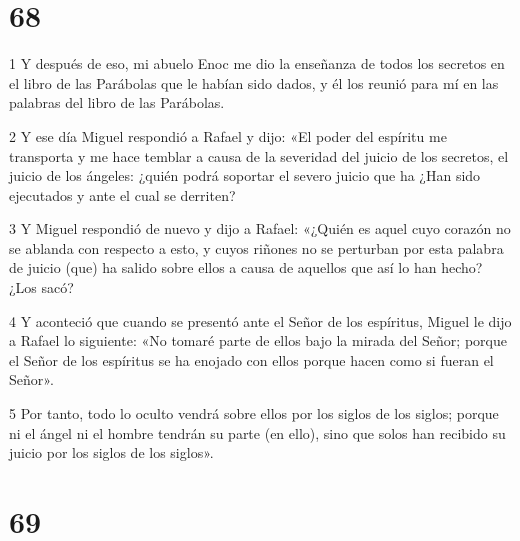 \chapter{68}

\par 1 Y después de eso, mi abuelo Enoc me dio la enseñanza de todos los secretos en el libro de las Parábolas que le habían sido dados, y él los reunió para mí en las palabras del libro de las Parábolas.
\par 2 Y ese día Miguel respondió a Rafael y dijo: «El poder del espíritu me transporta y me hace temblar a causa de la severidad del juicio de los secretos, el juicio de los ángeles: ¿quién podrá soportar el severo juicio que ha ¿Han sido ejecutados y ante el cual se derriten?
\par 3 Y Miguel respondió de nuevo y dijo a Rafael: «¿Quién es aquel cuyo corazón no se ablanda con respecto a esto, y cuyos riñones no se perturban por esta palabra de juicio (que) ha salido sobre ellos a causa de aquellos que así lo han hecho? ¿Los sacó?
\par 4 Y aconteció que cuando se presentó ante el Señor de los espíritus, Miguel le dijo a Rafael lo siguiente: «No tomaré parte de ellos bajo la mirada del Señor; porque el Señor de los espíritus se ha enojado con ellos porque hacen como si fueran el Señor».
\par 5 Por tanto, todo lo oculto vendrá sobre ellos por los siglos de los siglos; porque ni el ángel ni el hombre tendrán su parte (en ello), sino que solos han recibido su juicio por los siglos de los siglos».

\chapter{69}


